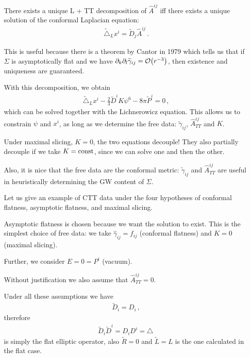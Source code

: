 \documentclass[main.tex]{subfiles}
\begin{document}
There exists a unique L + TT decomposition of \(\hat{A}^{ij}\) iff there exists a unique solution of the conformal Laplacian equation: 
%
\begin{align}
\widetilde{\triangle}_L x^{i} = \widetilde{D}_j \hat{A}^{ij}
\,.
\end{align}

This is useful because there is a theorem by Cantor in 1979 which tells us that if \(\Sigma \) is asymptotically flat and we have \(\partial_{k} \partial_{l} \widetilde{\gamma}_{ij} = \order{r^{-3}}\), 
then existence and uniqueness are guaranteed. 

With this decomposition, we obtain 
%
\begin{align}
\widetilde{\triangle}_L x^{i} - \frac{2}{3} \widetilde{D}^{i} K \psi^{6} - 8 \pi \widetilde{P}^{i} = 0
\,,
\end{align}
%
which can be solved together with the Lichnerowicz equation. 
This allows us to constrain \(\psi\) and \(x^{i}\), as long as we determine the free data: \(\widetilde{\gamma}_{ij}\), \(\hat{A}^{ij}_{TT}\) and \(K\). 

Under maximal slicing, \(K = 0\), the two equations decouple! 
They also partially decouple if we take \(K = \text{const}\), since we can solve one and then the other.

Also, it is nice that the free data are the conformal metric: \(\widetilde{\gamma}_{ij}\) and \(\hat{A}_{TT}^{ij}\) are useful in heuristically determining the GW content of \(\Sigma \). 

Let us give an example of CTT data under the four hypotheses of conformal flatness, asymptotic flatness, and maximal slicing. 

Asymptotic flatness is chosen because we want the solution to exist.
This is the simplest choice of free data: we take \(\hat{\gamma}_{ij} = f_{ij}\) (conformal flatness) and \(K = 0\) (maximal slicing).

Further, we consider \(E = 0 = P^{i}\) (vacuum). 

Without justification we also assume that \(\hat{A}^{ij}_{TT} = 0\). 

Under all these assumptions we have 
%
\begin{align}
\widetilde{D}_i = D_i 
\,,
\end{align}
%
therefore 
%
\begin{align}
\widetilde{D}_i \widetilde{D}^{i} = D_i D^{i} = \triangle
\,
\end{align}
%
is simply the flat elliptic operator, also \(\widetilde{R} = 0\) and \(\widetilde{L} = L\) is the one calculated in the flat case. 
\end{document}
